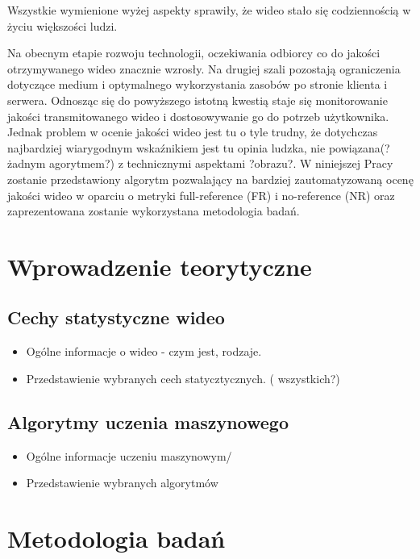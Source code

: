 Wszystkie wymienione wyżej aspekty sprawiły, że wideo stało się codziennością w życiu większości ludzi.\par

Na obecnym etapie rozwoju technologii, oczekiwania odbiorcy co do jakości otrzymywanego wideo znacznie wzrosły. Na drugiej szali pozostają ograniczenia dotyczące medium i optymalnego wykorzystania zasobów po stronie klienta i serwera. Odnosząc się do powyższego istotną kwestią staje się monitorowanie jakości transmitowanego wideo i dostosowywanie go do potrzeb użytkownika. Jednak problem w ocenie jakości wideo jest tu o tyle trudny, że dotychczas najbardziej wiarygodnym wskaźnikiem jest tu opinia ludzka, nie powiązana(?żadnym agorytmem?) z technicznymi aspektami ?obrazu?. W niniejszej Pracy zostanie przedstawiony algorytm pozwalający na bardziej zautomatyzowaną ocenę jakości wideo w oparciu o metryki full-reference (FR) i no-reference (NR) oraz zaprezentowana zostanie wykorzystana metodologia badań.



\chapter{Wprowadzenie teorytyczne}
\label{cha:pierwszyDokument}


\section{Cechy statystyczne wideo}

\begin{itemize}
\item Ogólne informacje o wideo - czym jest, rodzaje.
\item Przedstawienie wybranych cech statycztycznych. ( wszystkich?) 
\end{itemize}


\section{Algorytmy uczenia maszynowego }
\label{cha:pierwszyDokument}

\begin{itemize}
\item Ogólne informacje uczeniu maszynowym/
\item Przedstawienie wybranych algorytmów 
\end{itemize}

\chapter{Metodologia badań}
\label{cha:pierwszyDokument}

